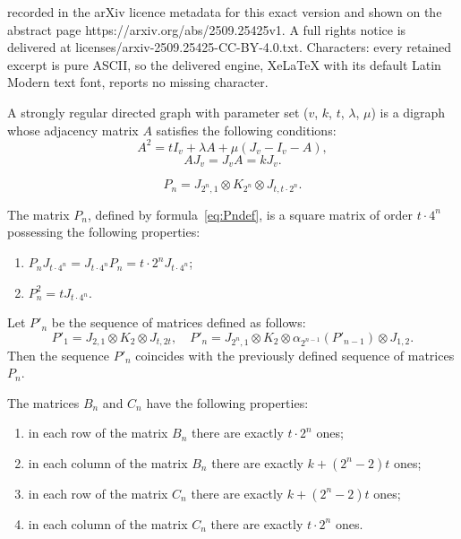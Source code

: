 \documentclass[10pt,a4paper]{amsart}
\begin{document}
recorded in the arXiv licence metadata for this exact version and shown on the abstract page https://arxiv.org/abs/2509.25425v1. A full rights notice is delivered at licenses/arxiv-2509.25425-CC-BY-4.0.txt. Characters: every retained excerpt is pure ASCII, so the delivered engine, XeLaTeX with its default Latin Modern text font, reports no missing character.
\begin{definition}
	\label{def:main2}
	A strongly regular directed graph with parameter set ($v$, $k$, $t$, $\lambda$, $\mu$) is a digraph whose adjacency matrix $A$ satisfies the following conditions:
    \begin{equation}
	\label{eq:main1}
	A^2 = t I_v + \lambda A + \mu (J_v - I_v - A),
	\end{equation}
	\begin{equation}
	\label{eq:main2}
	A J_v = J_v A = k J_v.
	\end{equation}
\end{definition}

\begin{equation}
\label{eq:Pndef}
P_n = J_{2^n, 1} \otimes K_{2^n} \otimes J_{t, t\cdot 2^n}.
\end{equation}

\begin{lemma}
\label{lemma:propPn}
The matrix $P_n$, defined by formula~\eqref{eq:Pndef}, is a square matrix of order $t \cdot 4^n$ possessing the following properties:
\begin{enumerate}
	\item $P_n J_{t\cdot 4^n} = J_{t\cdot 4^n} P_n = t\cdot2^n J_{t\cdot 4^n}$;
	\item $P_n^2 = t J_{t\cdot 4^n}$.
\end{enumerate} 
\end{lemma}

\begin{lemma}
\label{lemma:Pn_newdef}
Let $P'_n$ be the sequence of matrices defined as follows:
\begin{equation}
P'_1 = J_{2, 1} \otimes K_2 \otimes J_{t, 2t}, \quad P'_n = J_{2^n, 1} \otimes K_2 \otimes \alpha_{2^{n-1}}(P'_{n-1}) \otimes J_{1, 2}.
\end{equation}
Then the sequence $P'_n$ coincides with the previously defined sequence of matrices $P_n$.
\end{lemma}

\begin{lemma}
\label{lemma:summBnCn}
The matrices $B_n$ and $C_n$ have the following properties:
\begin{enumerate}
	\item in each row of the matrix $B_n$ there are exactly $t\cdot 2^n$ ones;
	\item in each column of the matrix $B_n$ there are exactly $k + (2^n - 2)t$ ones;
	\item in each row of the matrix $C_n$ there are exactly $k + (2^n - 2)t$ ones;
	\item in each column of the matrix $C_n$ there are exactly $t\cdot 2^n$ ones.			
\end{enumerate}
\end{lemma}
\end{document}
